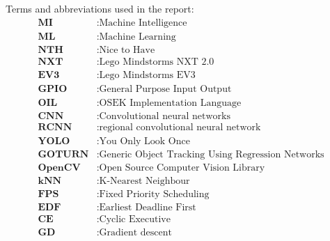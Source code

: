 
Terms and abbreviations used in the report:
\begin{align*}
    \textbf{MI} &: \text{Machine Intelligence} \\
    \textbf{ML} &: \text{Machine Learning} \\
    \textbf{NTH} &: \text{Nice to Have} \\
    \textbf{NXT} &: \text{Lego Mindstorms NXT 2.0} \\
    \textbf{EV3} &: \text{Lego Mindstorms EV3} \\  
    \textbf{GPIO} &: \text{General Purpose Input Output} \\
    \textbf{OIL} &: \text{OSEK Implementation Language} \\
    \textbf{CNN} &: \text{Convolutional neural networks} \\ 
    \textbf{RCNN} &: \text{regional convolutional neural network} \\ 
    \textbf{YOLO} &: \text{You Only Look Once} \\ 
    \textbf{GOTURN} &: \text{Generic Object Tracking Using Regression Networks} \\
    \textbf{OpenCV} &: \text{Open Source Computer Vision Library} \\
    \textbf{kNN} &: \text{K-Nearest Neighbour} \\
    \textbf{FPS} &: \text{Fixed Priority Scheduling} \\
    \textbf{EDF} &: \text{Earliest Deadline First} \\
    \textbf{CE} &: \text{Cyclic Executive} \\
    \textbf{GD} &: \text{Gradient descent} \\
\end{align*}
